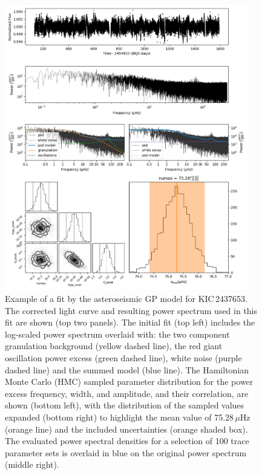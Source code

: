 \begin{figure}
    \centering
    \includegraphics[width=0.95\textwidth]{Chapter5/2437653_pymc3_numax.png}
    \caption[Example of a fit by the asteroseismic GP model for KIC 2437653]{Example of a fit by the asteroseismic GP model for KIC\,2437653. The corrected light curve and resulting power spectrum used in this fit are shown (top two panels). The initial fit (top left) includes the log-scaled power spectrum overlaid with: the two component granulation background (yellow dashed line), the red giant oscillation power excess (green dashed line), white noise (purple dashed line) and the summed model (blue line). The Hamiltonian Monte Carlo (HMC) sampled parameter distribution for the power excess frequency, width, and amplitude, and their correlation, are shown (bottom left), with the distribution of the sampled \numax{} values expanded (bottom right) to highlight the mean value of 75.28\,$\mu$Hz (orange line) and the included uncertainties (orange shaded box). The evaluated power spectral densities for a selection of 100 trace parameter sets is overlaid in blue on the original power spectrum (middle right).}
    \label{fig:pm_model}
\end{figure}

